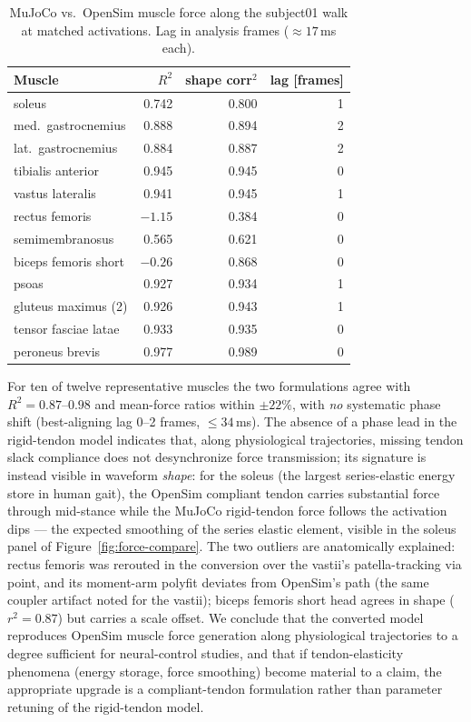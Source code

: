 \begin{table}[h]
  \centering
  \caption{MuJoCo vs.\ OpenSim muscle force along the subject01 walk at
  matched activations. Lag in analysis frames ($\approx 17$\,ms each).}
  \label{tab:force-r2}
  \small
  \begin{tabular}{lrrr}
    \toprule
    Muscle & $R^2$ & shape corr$^2$ & lag [frames] \\
    \midrule
    soleus   & 0.742 & 0.800 & 1 \\
    med.\ gastrocnemius & 0.888 & 0.894 & 2 \\
    lat.\ gastrocnemius & 0.884 & 0.887 & 2 \\
    tibialis anterior & 0.945 & 0.945 & 0 \\
    vastus lateralis & 0.941 & 0.945 & 1 \\
    rectus femoris & $-1.15$ & 0.384 & 0 \\
    semimembranosus & 0.565 & 0.621 & 0 \\
    biceps femoris short & $-0.26$ & 0.868 & 0 \\
    psoas & 0.927 & 0.934 & 1 \\
    gluteus maximus (2) & 0.926 & 0.943 & 1 \\
    tensor fasciae latae & 0.933 & 0.935 & 0 \\
    peroneus brevis & 0.977 & 0.989 & 0 \\
    \bottomrule
  \end{tabular}
\end{table}

For ten of twelve representative muscles the two formulations agree
with $R^2 = 0.87$--$0.98$ and mean-force ratios within $\pm 22\%$, with
\emph{no} systematic phase shift (best-aligning lag 0--2 frames,
$\le 34$\,ms). The absence of a phase lead in the rigid-tendon model
indicates that, along physiological trajectories, missing tendon slack
compliance does not desynchronize force transmission; its signature is
instead visible in waveform \emph{shape}: for the soleus (the largest
series-elastic energy store in human gait), the OpenSim compliant
tendon carries substantial force through mid-stance while the MuJoCo
rigid-tendon force follows the activation dips --- the expected
smoothing of the series elastic element, visible in the soleus panel of
Figure~\ref{fig:force-compare}. The two outliers are
anatomically explained: rectus femoris was rerouted in the conversion
over the vastii's patella-tracking via point, and its moment-arm
polyfit deviates from OpenSim's path (the same coupler artifact noted
for the vastii); biceps femoris short head agrees in shape
($r^2 = 0.87$) but carries a scale offset. We conclude that the
converted model reproduces OpenSim muscle force generation along
physiological trajectories to a degree sufficient for neural-control
studies, and that if tendon-elasticity phenomena (energy storage,
force smoothing) become material to a claim, the appropriate upgrade
is a compliant-tendon formulation rather than parameter retuning of
the rigid-tendon model.

